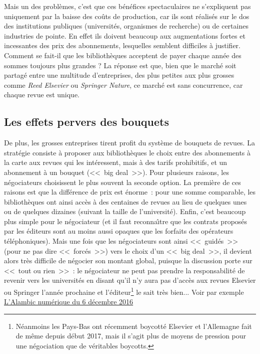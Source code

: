Mais un des probl{\`e}mes, c'est que ces b{\'e}n{\'e}fices spectaculaires ne s'expliquent pas uniquement par la baisse des co{\^u}ts de production, car ils sont
r{\'e}alis{\'e}s sur le dos des institutions publiques (universit{\'e}s, organismes de recherche) ou de certaines industries de pointe. En effet ils doivent
beaucoup aux augmentations fortes et incessantes des prix des abonnements, lesquelles semblent difficiles {\`a} justifier. Comment se fait-il
que les biblioth{\`e}ques acceptent de payer chaque ann{\'e}e des sommes toujours plus grandes ? La r{\'e}ponse est que, bien que le march{\'e} soit
partag{\'e} entre une multitude d'entreprises, des plus petites aux plus grosses comme \emph{Reed Elsevier} ou \emph{Springer Nature},
ce march{\'e} est sans concurrence,
car chaque revue est unique.

\subsection{Les effets pervers des bouquets}

De plus, les grosses entreprises tirent profit du syst{\`e}me de bouquets de revues. La strat{\'e}gie consiste {\`a} proposer aux biblioth{\`e}ques le choix entre
des abonnements {\`a} la carte aux revues qui les int{\'e}ressent, mais {\`a} des tarifs prohibitifs, et un abonnement {\`a} un bouquet (<<~big deal~>>). Pour plusieurs
raisons, les n{\'e}gociateurs choisissent le plus souvent la seconde option. La premi{\`e}re de ces raisons est que la diff{\'e}rence de prix est {\'e}norme~: pour une
somme comparable, les biblioth{\`e}ques ont ainsi acc{\`e}s {\`a} des centaines de revues au lieu de quelques unes ou de quelques dizaines (suivant la taille de 
l'universit{\'e}). Enfin, c'est beaucoup plus simple pour le n{\'e}gociateur (et il faut reconna{\^\i}tre que les contrats propos{\'e}s par les {\'e}diteurs sont au moins
aussi opaques que les forfaits des op{\'e}rateurs t{\'e}l{\'e}phoniques). Mais une fois que les n{\'e}gociateurs sont ainsi <<~guid{\'e}s~>> (pour ne pas dire <<~forc{\'e}s~>>) vers
le choix d'un <<~big deal~>>, il devient alors tr{\`e}s difficile de n{\'e}gocier son montant global, puisque la discussion porte sur <<~tout ou rien~>>~: le n{\'e}gociateur
ne peut pas prendre la responsabilit{\'e} de revenir vers les universit{\'e}s en disant qu'il n'y aura pas d'acc{\`e}s aux revues Elsevier ou Springer l'ann{\'e}e
prochaine et l'{\'e}diteur\footnote{N{\'e}anmoins les Pays-Bas ont r{\'e}cemment boycott{\'e} Elsevier et l'Allemagne fait de m{\^e}me depuis d{\'e}but 2017,
mais il s'agit plus de moyens de pression pour une n{\'e}gociation que de v{\'e}ritables boycotts.}
le sait tr{\`e}s bien... Voir par exemple  \href{http://alambic.hypotheses.org/6245}{L'Alambic num{\'e}rique du 6 d{\'e}cembre 2016}

